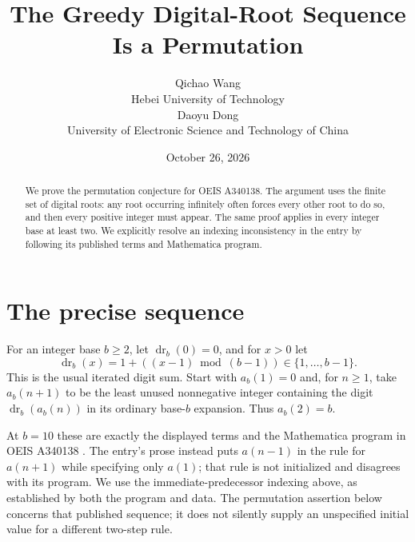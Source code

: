 \documentclass[10pt]{article}
\title{The Greedy Digital-Root Sequence Is a Permutation}
\author{Qichao Wang\\{\small Hebei University of Technology}\\[0.3em]
Daoyu Dong\\{\small University of Electronic Science and Technology of China}}
\date{October 26, 2026}
\begin{document}
\maketitle
\begin{abstract}
We prove the permutation conjecture for OEIS A340138. The argument
uses the finite set of digital roots: any root occurring infinitely
often forces every other root to do so, and then every positive
integer must appear. The same proof applies in every integer base
at least two. We explicitly resolve an indexing inconsistency in
the entry by following its published terms and Mathematica program.
\end{abstract}

\section{The precise sequence}
For an integer base $b\ge2$, let $\operatorname{dr}_b(0)=0$, and
for $x>0$ let
\[
 \operatorname{dr}_b(x)=1+((x-1)\bmod(b-1))\in\{1,\ldots,b-1\}.
\]
This is the usual iterated digit sum. Start with $a_b(1)=0$ and,
for $n\ge1$, take $a_b(n+1)$ to be the least unused nonnegative
integer containing the digit $\operatorname{dr}_b(a_b(n))$ in its
ordinary base-$b$ expansion. Thus $a_b(2)=b$.

At $b=10$ these are exactly the displayed terms and the Mathematica
program in OEIS A340138 \cite{oeis}. The entry's prose instead
puts $a(n-1)$ in the rule for $a(n+1)$ while specifying only $a(1)$;
that rule is not initialized and disagrees with its program. We use
the immediate-predecessor indexing above, as established by both
the program and data. The permutation assertion below concerns
that published sequence; it does not silently supply an unspecified
initial value for a different two-step rule.
\end{document}
